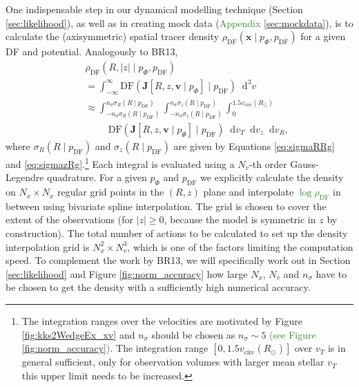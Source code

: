 \documentclass[iop,revtex4]{emulateapj}
\newcommand{\vect}[1]{\boldsymbol{#1}}
\newcommand*\diff{\mathop{}\!\mathrm{d}}
\newcommand*\Diff[1]{\mathop{}\!\mathrm{d^#1}}
\newcommand{\NEW}[1]{\textcolor{ForestGreen}{#1}}
\newcommand{\OLD}[1]{}
\begin{document}
One indispensable step in our dynamical modelling technique (Section \ref{sec:likelihood}), as well as in creating mock data (\OLD{Section}\NEW{Appendix} \ref{sec:mockdata}), is to calculate the (axisymmetric) spatial tracer density $\rho_\text{DF}(\vect{x} \mid p_{\Phi},p_\text{DF})$ for a given DF and potential. Analogously to BR13, 
\begin{eqnarray}
&&\rho_\text{DF}(R,|z| \mid p_{\Phi},p_\text{DF}) \nonumber\\
&&= \int_{-\infty}^{\infty} \text{DF}(\vect{J}[R,z,\vect{v} \mid p_{\Phi}] \mid p_\text{DF}) \Diff3 v  \nonumber\\
&&\approx \int_{-n_\sigma \sigma_R(R \mid p_\text{DF})}^{n_\sigma \sigma_R(R \mid p_\text{DF})} \int_{-n_\sigma\sigma_z(R \mid p_\text{DF})}^{n_\sigma \sigma_z(R \mid p_\text{DF})} \int_{0}^{1.5 v_\text{circ}(R_\odot)}  \nonumber\\
& & \hspace{1cm} \text{DF}(\vect{J}[R,z,\vect{v} \mid p_{\Phi}] \mid p_\text{DF}) \diff v_T \diff v_z \diff v_R, \label{eq:tracerdensity}
\end{eqnarray}
where $\sigma_R(R \mid p_\text{DF})$ and $\sigma_z(R \mid p_\text{DF})$ are given by Equations \eqref{eq:sigmaRRg} and \eqref{eq:sigmazRg}.\footnote{The integration ranges over the velocities are motivated by Figure \ref{fig:kks2WedgeEx_xv} and $n_\sigma$ should be chosen as $n_\sigma \sim 5$ \NEW{(see Figure \ref{fig:norm_accuracy})}. The integration range $[0,1.5 v_\text{circ}(R_\odot)]$ over $v_T$ is in general sufficient, only for observation volumes with larger mean stellar $v_T$ this upper limit needs to be increased.} Each integral is evaluated using a $N_v$-th order Gauss-Legendre quadrature. For a given $p_\Phi$ and $p_\text{DF}$ we explicitly calculate the density on $N_x \times N_x$ regular grid points in the $(R,z)$ plane and interpolate \NEW{$\log \rho_\text{DF}$} in between using bivariate spline interpolation. The grid is chosen to cover the extent of the observations (for $|z|\geq0$, because the model is symmetric in $z$ by construction). The total number of actions to be calculated to set up the density interpolation grid is $N_x^2 \times N_v^3$, which is one of the factors limiting the computation speed. To complement the work by BR13, we will specifically work out in Section \ref{sec:likelihood} and Figure \ref{fig:norm_accuracy} how large $N_x$, $N_v$ and $n_\sigma$ have to be chosen to get the density with a sufficiently high numerical accuracy. 

\end{document}
